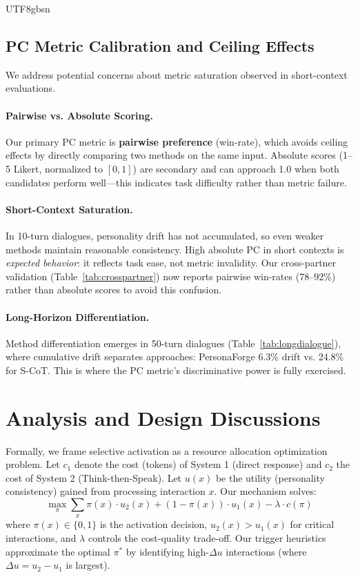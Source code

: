 \documentclass[11pt]{article}
\begin{document}
\begin{CJK*}{UTF8}{gbsn}
\subsection{PC Metric Calibration and Ceiling Effects}
\label{sec:pc_calibration}

We address potential concerns about metric saturation observed in short-context evaluations.

\paragraph{Pairwise vs. Absolute Scoring.} Our primary PC metric is \textbf{pairwise preference} (win-rate), which avoids ceiling effects by directly comparing two methods on the same input. Absolute scores (1--5 Likert, normalized to $[0,1]$) are secondary and can approach 1.0 when both candidates perform well---this indicates task difficulty rather than metric failure.

\paragraph{Short-Context Saturation.} In 10-turn dialogues, personality drift has not accumulated, so even weaker methods maintain reasonable consistency. High absolute PC in short contexts is \textit{expected behavior}: it reflects task ease, not metric invalidity. Our cross-partner validation (Table~\ref{tab:crosspartner}) now reports pairwise win-rates (78--92\%) rather than absolute scores to avoid this confusion.

\paragraph{Long-Horizon Differentiation.} Method differentiation emerges in 50-turn dialogues (Table~\ref{tab:longdialogue}), where cumulative drift separates approaches: PersonaForge 6.3\% drift vs. 24.8\% for S-CoT. This is where the PC metric's discriminative power is fully exercised.


\section{Analysis and Design Discussions}
\label{sec:cognitive_economic}

Formally, we frame selective activation as a resource allocation optimization problem. Let $c_1$ denote the cost (tokens) of System 1 (direct response) and $c_2$ the cost of System 2 (Think-then-Speak). Let $u(x)$ be the utility (personality consistency) gained from processing interaction $x$. Our mechanism solves:
\begin{equation}
\max_{\pi} \sum_{x} \pi(x) \cdot u_2(x) + (1-\pi(x)) \cdot u_1(x) - \lambda \cdot c(\pi)
\end{equation}
where $\pi(x) \in \{0,1\}$ is the activation decision, $u_2(x) > u_1(x)$ for critical interactions, and $\lambda$ controls the cost-quality trade-off. Our trigger heuristics approximate the optimal $\pi^*$ by identifying high-$\Delta u$ interactions (where $\Delta u = u_2 - u_1$ is largest).


\end{CJK*}
\end{document}

